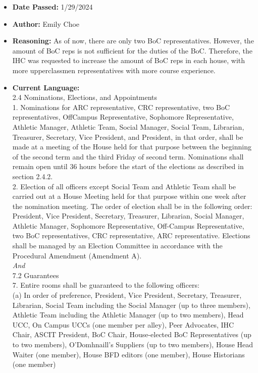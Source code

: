 \documentclass[10pt]{article} %
\begin{document}
\begin{itemize}
	\item \textbf{Date Passed:} 1/29/2024
	\item \textbf{Author:} Emily Choe
	\item \textbf{Reasoning:} As of now, there are only two BoC representatives. However, the amount of BoC reps is not sufficient for the duties of the BoC. Therefore, the IHC was requested to increase the amount of BoC reps in each house, with more upperclassmen representatives with more course experience.
	\item \textbf{Current Language:} \\
	2.4 Nominations, Elections, and Appointments \\
	1. Nominations for ARC representative, CRC representative, two BoC representatives, OffCampus Representative, Sophomore Representative, Athletic Manager, Athletic Team, Social Manager, Social Team, Librarian, Treasurer, Secretary, Vice President, and President, in that order, shall be made at a meeting of the House held for that purpose between the beginning of the second term and the third Friday of second term. Nominations shall remain open until 36 hours before the start of the elections as described in section 2.4.2. \\
	2. Election of all officers except Social Team and Athletic Team shall be carried out at a House Meeting held for that purpose within one week after the nomination meeting. The order of election shall be in the following order: President, Vice President, Secretary, Treasurer, Librarian, Social Manager, Athletic Manager, Sophomore Representative, Off-Campus Representative, two BoC representatives, CRC representative, ARC representative. Elections shall be managed by an Election Committee in accordance with the Procedural Amendment (Amendment A). \\
	\textit{And} \\
	7.2 Guarantees \\
	7. Entire rooms shall be guaranteed to the following officers: \\
	(a) In order of preference, President, Vice President, Secretary, Treasurer, Librarian, Social Team including the Social Manager (up to three members), Athletic Team including the Athletic Manager (up to two members), Head UCC, On Campus UCCs (one member per alley), Peer Advocates, IHC Chair, ASCIT President, BoC Chair, House-elected BoC Representatives (up to two members), O'Domhnaill's Suppliers (up to two members), House Head Waiter (one member), House BFD editors (one member), House Historians (one member) \\

\end{itemize}
\end{document}

